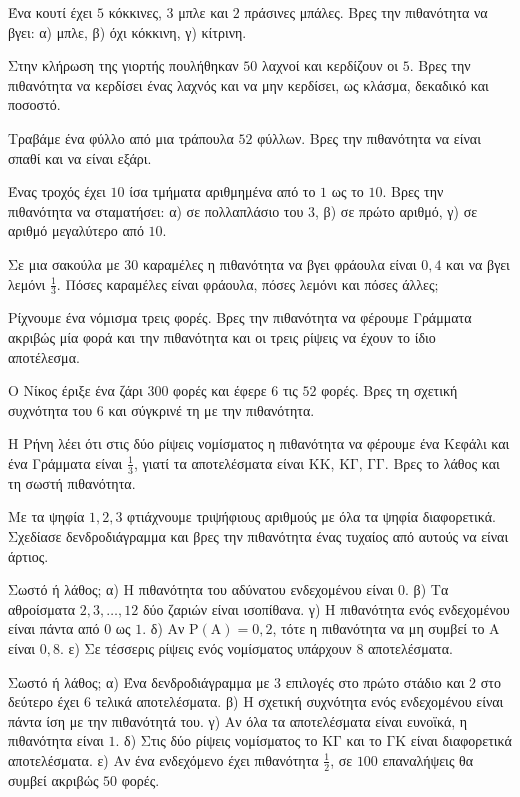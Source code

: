 \ex Ένα κουτί έχει $5$ κόκκινες, $3$ μπλε και $2$ πράσινες μπάλες. Βρες την πιθανότητα να βγει: α) μπλε, β) όχι κόκκινη, γ) κίτρινη.

\ex Στην κλήρωση της γιορτής πουλήθηκαν $50$ λαχνοί και κερδίζουν οι $5$. Βρες την πιθανότητα να κερδίσει ένας λαχνός και να μην κερδίσει, ως κλάσμα, δεκαδικό και ποσοστό.

\ex Τραβάμε ένα φύλλο από μια τράπουλα $52$ φύλλων. Βρες την πιθανότητα να είναι σπαθί και να είναι εξάρι.

\ex Ένας τροχός έχει $10$ ίσα τμήματα αριθμημένα από το $1$ ως το $10$. Βρες την πιθανότητα να σταματήσει: α) σε πολλαπλάσιο του $3$, β) σε πρώτο αριθμό, γ) σε αριθμό μεγαλύτερο από $10$.

\ex Σε μια σακούλα με $30$ καραμέλες η πιθανότητα να βγει φράουλα είναι $0{,}4$ και να βγει λεμόνι $\frac{1}{3}$. Πόσες καραμέλες είναι φράουλα, πόσες λεμόνι και πόσες άλλες;

\ex Ρίχνουμε ένα νόμισμα τρεις φορές. Βρες την πιθανότητα να φέρουμε Γράμματα ακριβώς μία φορά και την πιθανότητα και οι τρεις ρίψεις να έχουν το ίδιο αποτέλεσμα.

\ex Ο Νίκος έριξε ένα ζάρι $300$ φορές και έφερε $6$ τις $52$ φορές. Βρες τη σχετική συχνότητα του $6$ και σύγκρινέ τη με την πιθανότητα.

\ex Η Ρήνη λέει ότι στις δύο ρίψεις νομίσματος η πιθανότητα να φέρουμε ένα Κεφάλι και ένα Γράμματα είναι $\frac{1}{3}$, γιατί τα αποτελέσματα είναι $\mathrm{ΚΚ}$, $\mathrm{ΚΓ}$, $\mathrm{ΓΓ}$. Βρες το λάθος και τη σωστή πιθανότητα.

\ex Με τα ψηφία $1,2,3$ φτιάχνουμε τριψήφιους αριθμούς με όλα τα ψηφία διαφορετικά. Σχεδίασε δενδροδιάγραμμα και βρες την πιθανότητα ένας τυχαίος από αυτούς να είναι άρτιος.

\ex Σωστό ή λάθος; α) Η πιθανότητα του αδύνατου ενδεχομένου είναι $0$. β) Τα αθροίσματα $2,3,\dots,12$ δύο ζαριών είναι ισοπίθανα. γ) Η πιθανότητα ενός ενδεχομένου είναι πάντα από $0$ ως $1$. δ) Αν $\mathrm{Ρ}(\mathrm{Α})=0{,}2$, τότε η πιθανότητα να μη συμβεί το $\mathrm{Α}$ είναι $0{,}8$. ε) Σε τέσσερις ρίψεις ενός νομίσματος υπάρχουν $8$ αποτελέσματα.

\ex Σωστό ή λάθος; α) Ένα δενδροδιάγραμμα με $3$ επιλογές στο πρώτο στάδιο και $2$ στο δεύτερο έχει $6$ τελικά αποτελέσματα. β) Η σχετική συχνότητα ενός ενδεχομένου είναι πάντα ίση με την πιθανότητά του. γ) Αν όλα τα αποτελέσματα είναι ευνοϊκά, η πιθανότητα είναι $1$. δ) Στις δύο ρίψεις νομίσματος το $\mathrm{ΚΓ}$ και το $\mathrm{ΓΚ}$ είναι διαφορετικά αποτελέσματα. ε) Αν ένα ενδεχόμενο έχει πιθανότητα $\frac{1}{2}$, σε $100$ επαναλήψεις θα συμβεί ακριβώς $50$ φορές.


